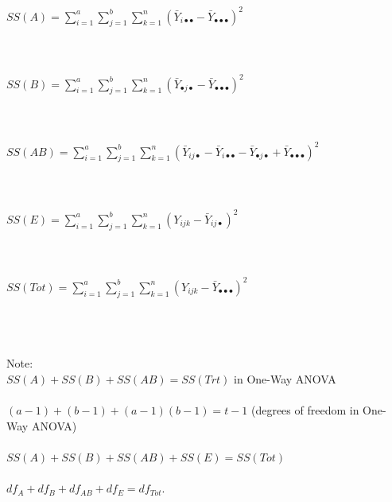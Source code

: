 \newpage
\begin{flushleft}
$SS(A)=\sum_{i=1}^{a}\sum_{j=1}^{b}\sum_{k=1}^{n}(\bar{Y}_{i\bullet\bullet}-\bar{Y}_{\bullet\bullet\bullet})^2$\\~\\~\\~\\
$SS(B)=\sum_{i=1}^{a}\sum_{j=1}^{b}\sum_{k=1}^{n}(\bar{Y}_{\bullet j\bullet}-\bar{Y}_{\bullet\bullet\bullet})^2$\\~\\~\\~\\
$SS(AB)=\sum_{i=1}^{a}\sum_{j=1}^{b}\sum_{k=1}^{n}(\bar{Y}_{ij\bullet}-\bar{Y}_{i\bullet\bullet}-\bar{Y}_{\bullet j\bullet}+\bar{Y}_{\bullet\bullet\bullet})^2$\\~\\~\\~\\
$SS(E)=\sum_{i=1}^{a}\sum_{j=1}^{b}\sum_{k=1}^{n}(Y_{ijk}-\bar{Y}_{ij\bullet})^2$\\~\\~\\~\\
$SS(Tot)=\sum_{i=1}^{a}\sum_{j=1}^{b}\sum_{k=1}^{n}(Y_{ijk}-\bar{Y}_{\bullet\bullet\bullet})^2$\\~\\~\\~\\
\end{flushleft}	

Note: \\
$SS(A)+SS(B)+SS(AB) = SS(Trt)$ in One-Way ANOVA\\~\\
$(a-1)+(b-1)+(a-1)(b-1)=t-1$ (degrees of freedom in One-Way ANOVA)\\~\\
$SS(A)+SS(B)+SS(AB)+SS(E)=SS(Tot)$\\~\\
$df_A+df_B+df_{AB}+df_E=df_{Tot}$.

\newpage

